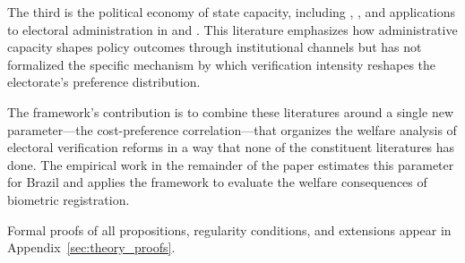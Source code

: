 The third is the political economy of state capacity, including \citet{besleyPersson2011}, \citet{AcemogluRobinson2019}, and applications to electoral administration in \citet{fujiwara2015} and \citet{Marx2021}. This literature emphasizes how administrative capacity shapes policy outcomes through institutional channels but has not formalized the specific mechanism by which verification intensity reshapes the electorate's preference distribution.

The framework's contribution is to combine these literatures around a single new parameter---the cost-preference correlation---that organizes the welfare analysis of electoral verification reforms in a way that none of the constituent literatures has done. The empirical work in the remainder of the paper estimates this parameter for Brazil and applies the framework to evaluate the welfare consequences of biometric registration.

Formal proofs of all propositions, regularity conditions, and extensions appear in Appendix~\ref{sec:theory_proofs}.
